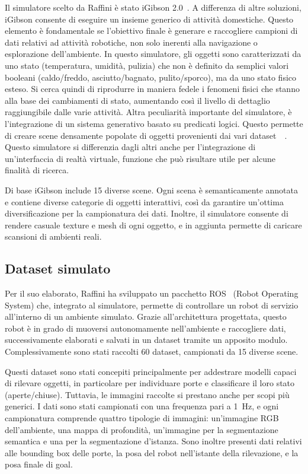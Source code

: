 \documentclass[12pt]{report}
\begin{document}
Il simulatore scelto da Raffini è stato iGibson 2.0~\cite{li2021igibson}. A differenza di altre soluzioni, iGibson consente di eseguire un insieme generico di attività domestiche. Questo elemento è fondamentale se l'obiettivo finale è generare e raccogliere campioni di dati relativi ad attività robotiche, non solo inerenti alla navigazione o esplorazione dell'ambiente. In questo simulatore, gli oggetti sono caratterizzati da uno stato (temperatura, umidità, pulizia) che non è definito da semplici valori booleani (caldo/freddo, asciutto/bagnato, pulito/sporco), ma da uno stato fisico esteso. Si cerca quindi di riprodurre in maniera fedele i fenomeni fisici che stanno alla base dei cambiamenti di stato, aumentando così il livello di dettaglio raggiungibile dalle varie attività. Altra peculiarità importante del simulatore, è l'integrazione di un sistema generativo basato su predicati logici. Questo permette di creare scene densamente popolate di oggetti provenienti dai vari dataset~\cite{doi:10.1177/0278364919844314}~\cite{pmlr-v164-srivastava22a}. Questo simulatore si differenzia dagli altri anche per l'integrazione di un'interfaccia di realtà virtuale, funzione che può risultare utile per alcune finalità di ricerca.

Di base iGibson include 15 diverse scene. Ogni scena è semanticamente annotata e contiene diverse categorie di oggetti interattivi, così da garantire un'ottima diversificazione per la campionatura dei dati. Inoltre, il simulatore consente di rendere casuale texture e mesh di ogni oggetto, e in aggiunta permette di caricare scansioni di ambienti reali.

\subsection{Dataset simulato}
\label{sec:dataset_simulato}

Per il suo elaborato, Raffini ha sviluppato un pacchetto ROS~\cite{quigley2009ros} (Robot Operating System) che, integrato al simulatore, permette di controllare un robot di servizio all'interno di un ambiente simulato. Grazie all'architettura progettata, questo robot è in grado di muoversi autonomamente nell'ambiente e raccogliere dati, successivamente elaborati e salvati in un dataset tramite un apposito modulo. Complessivamente sono stati raccolti 60 dataset, campionati da 15 diverse scene.

Questi dataset sono stati concepiti principalmente per addestrare modelli capaci di rilevare oggetti, in particolare per individuare porte e classificare il loro stato (aperte/chiuse). Tuttavia, le immagini raccolte si prestano anche per scopi più generici. I dati sono stati campionati con una frequenza pari a \SI{1}{\hertz}, e ogni campionatura comprende quattro tipologie di immagini: un'immagine RGB dell'ambiente, una mappa di profondità, un'immagine per la segmentazione semantica e una per la segmentazione d'istanza. Sono inoltre presenti dati relativi alle bounding box delle porte, la posa del robot nell'istante della rilevazione, e la posa finale di goal.
\end{document}
